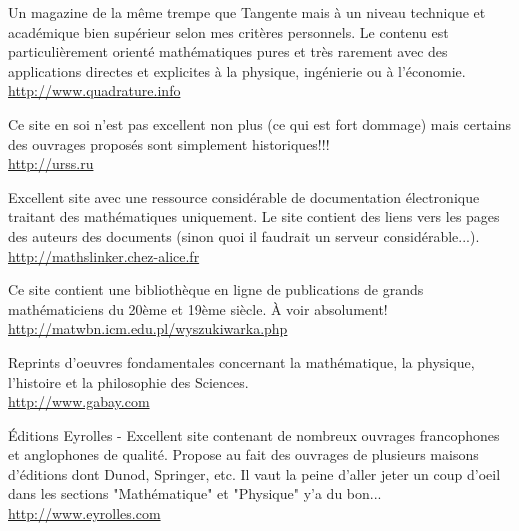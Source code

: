 	{\Large {}}{\Large {}}{\Large {}}{\Large {}}\bcdfrance{} Un magazine de la même trempe que Tangente mais à un niveau technique et académique bien supérieur selon mes critères personnels. Le contenu est particulièrement orienté mathématiques pures et très rarement avec des applications directes et explicites à la physique, ingénierie ou à l'économie.\\
	\href{http://www.quadrature.info}{\color{blue}http://www.quadrature.info}
	
	{\Large {}}{\Large {}}{\Large {}}{\Large {}} Ce site en soi n'est pas excellent non plus (ce qui est fort dommage) mais certains des ouvrages proposés sont simplement historiques!!!\\
	\href{http://urss.ru}{\color{blue}http://urss.ru}
	
	{\Large {}}{\Large {}}{\Large {}}{\Large {}}\bcdfrance{} Excellent site avec une ressource considérable de documentation électronique traitant des mathématiques uniquement. Le site contient des liens vers les pages des auteurs des documents (sinon quoi il faudrait un serveur considérable...).\\
	\href{http://mathslinker.chez-alice.fr}{\color{blue}http://mathslinker.chez-alice.fr}
	
	{\Large {}}\bcdfrance{} Ce site contient une bibliothèque en ligne de publications de grands mathématiciens du 20ème et 19ème siècle. À voir absolument!\\
	\href{http://matwbn.icm.edu.pl/wyszukiwarka.php}{\color{blue}http://matwbn.icm.edu.pl/wyszukiwarka.php}
	
	{\Large {}}{\Large {}}{\Large {}}{\Large {}}\bcdfrance{} Reprints d'oeuvres fondamentales concernant la mathématique, la physique, l'histoire et la philosophie des Sciences.\\
	\href{http://www.gabay.com}{\color{blue}http://www.gabay.com}
	
	\pagebreak
	{\Large {}}{\Large {}}{\Large {}}{\Large {}}\bcdfrance{} Éditions Eyrolles - Excellent site contenant de nombreux ouvrages francophones et anglophones de qualité. Propose au fait des ouvrages de plusieurs maisons d'éditions dont Dunod, Springer, etc. Il vaut la peine d'aller jeter un coup d'oeil dans les sections "Mathématique" et "Physique" y'a du bon... \\
	\href{http://www.eyrolles.com}{\color{blue}http://www.eyrolles.com}
	
